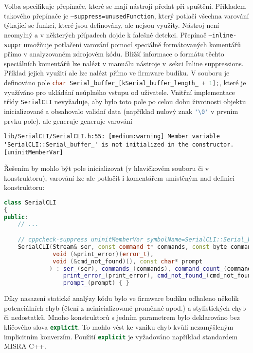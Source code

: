 Volba  specifikuje přepínače, které se mají nástroji
 předat při spuštění. Příkladem takového přepínače je
\texttt{--suppress=unusedFunction}, který potlačí všechna varování týkající se
funkcí, které jsou definovány, ale nejsou využity.
Nástroj není neomylný a v některých případech dojde k falešné detekci. Přepínač
\texttt{--inline-suppr} umožňuje potlačení varování pomocí speciálně
formátovaných komentářů přímo v analyzovaném zdrojovém kódu. Bližší informace
o formátu těchto speciálních komentářů lze nalézt v manuálu nástroje
v~sekci \foreignlanguage{english}{Inline suppressions}.~\cite{cppcheckmanual}
Příklad jejich využití ale lze nalézt přímo ve firmware budíku.
V souboru  je definováno pole
\lstinline[language=C]!char Serial_buffer_[kSerial_buffer_length_ + 1];!,
které je využíváno pro ukládání neúplného vstupu od uživatele. Vnitřní
implementace třídy \texttt{SerialCLI} nevyžaduje, aby bylo toto pole po celou
dobu životnosti objektu inicializované a obsahovalo validní data (například
nulový znak \lstinline[language=C]!'\0'! v prvním prvku pole).
 ale generuje generuje varování
\begin{lstlisting}[style=terminal,breakatwhitespace=true]
lib/SerialCLI/SerialCLI.h:55: [medium:warning] Member variable 'SerialCLI::Serial_buffer_' is not initialized in the constructor. [uninitMemberVar]
\end{lstlisting}
Řešením by mohlo být pole inicializovat (v hlavičkovém souboru či v
konstruktoru), varování lze ale potlačit i komentářem umístěným nad definici
konstruktoru:
\begin{lstlisting}[language=C++]
class SerialCLI
{
public:
    // ...

    // cppcheck-suppress uninitMemberVar symbolName=SerialCLI::Serial_buffer_
    SerialCLI(Stream& ser, const command_t* commands, const byte command_count,
              void (&print_error)(error_t),
              void (&cmd_not_found)(), const char* prompt
             ) : ser_(ser), commands_(commands), command_count_(command_count),
                 print_error_(print_error), cmd_not_found_(cmd_not_found),
                 prompt_(prompt) { }
\end{lstlisting}


Díky nasazení statické analýzy kódu bylo ve firmware budíku odhaleno několik
potenciálních chyb (čtení z neinicializované proměnné apod.) a stylistických
chyb či nedostatků. Mnoho konstruktorů s jedním parametrem bylo deklarováno bez
klíčového slova \lstinline[language=C++]!explicit!. To mohlo vést ke vzniku
chyb kvůli nezamýšleným implicitním konverzím. Použití
\lstinline[language=C++]!explicit! je vyžadováno například standardem
MISRA C++.


